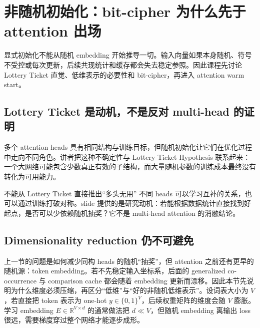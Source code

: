 \section{非随机初始化：bit-cipher 为什么先于 attention 出场}

显式初始化不能从随机 embedding 开始推导一切。输入向量如果本身随机、符号不受控或每次更新，后续共现统计和缓存都会失去稳定参照。因此课程先讨论 Lottery Ticket 直觉、低维表示的必要性和 bit-cipher，再进入 attention warm start。

\subsection{Lottery Ticket 是动机，不是反对 multi-head 的证明}

多个 attention heads 具有相同结构与训练目标，但随机初始化让它们在优化过程中走向不同角色。讲者把这种不确定性与 Lottery Ticket Hypothesis 联系起来：一个大网络可能包含少数真正有效的子结构，而大量随机参数的训练成本最终没有转化为可用能力。


\begin{warningbox}{不能从 Lottery Ticket 直接推出“多头无用”}
不同 heads 可以学习互补的关系，也可以通过训练打破对称。slide 提供的是研究动机：若能根据数据统计直接找到好起点，是否可以少依赖随机抽奖？它不是 multi-head attention 的消融结论。
\end{warningbox}


\subsection{Dimensionality reduction 仍不可避免}

上一节的问题是如何减少同构 heads 的随机“抽奖”，但 attention 之前还有更早的随机源：token embedding。若不先稳定输入坐标系，后面的 generalized co-occurrence 与 comparison cache 都会随着 embedding 更新而漂移。因此本节先说明为什么维度必须压缩，再区分“低维”与“好的非随机低维表示”。设词表大小为 $V$，若直接把 token 表示为 one-hot $y\in\{0,1\}^{V}$，后续权重矩阵的维度会随 $V$ 膨胀。学习 embedding $E\in\mathbb{R}^{V\times d}$ 的通常做法把 $d\ll V$，但随机 embedding 离输出 loss 很远，需要梯度穿过整个网络才能逐步成形。

